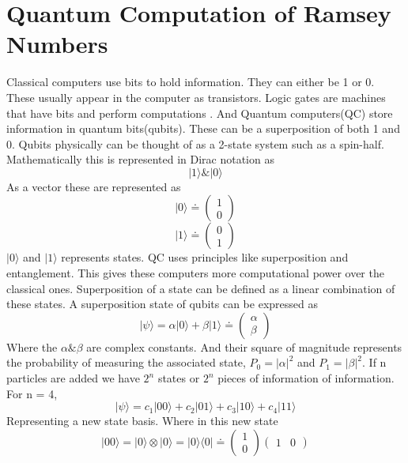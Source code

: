 \documentclass[15pt, a4paper]{Assignment}
\begin{document}
\section{Quantum Computation of Ramsey Numbers}
Classical computers use bits to hold information.
They can either be 1 or 0.
These usually appear in the computer as transistors.
Logic gates are machines that have bits and perform computations \cite{deutsch1985quantum}.
And Quantum computers(QC) store information in quantum bits(qubits).
These can be a superposition of both 1 and 0.
Qubits physically can be thought of as a 2-state system such as a spin-half.
Mathematically this is represented in Dirac notation as $$|1\rangle \& |0\rangle$$
As a vector these are represented as $$|0\rangle \doteq \begin{pmatrix}
	1\\0
\end{pmatrix}$$
$$|1\rangle \doteq \begin{pmatrix}
	0\\1
\end{pmatrix}$$
$|0\rangle$ and $|1\rangle$ represents states.
QC uses principles like superposition and entanglement.
This gives these computers more computational power over the classical ones.
Superposition of a state can be defined as a linear combination of these states.\cite{mcintyre_quantum_2012}
A superposition state of qubits can be expressed as \begin{equation}
|\psi\rangle = \alpha|0\rangle + \beta|1\rangle \doteq \begin{pmatrix}
	\alpha\\\beta
\end{pmatrix} \end{equation}
Where the $\alpha \& \beta$ are complex constants.
And their square of magnitude represents the probability of measuring the associated state, $P_{0}=|\alpha|^2$ and $P_{1}=|\beta|^2$. 
If n particles are added we have $2^n$ states or $2^n$ pieces of information of information. 
For n = 4,
\begin{equation}
	|\psi\rangle =c_1 |00\rangle+c_2 |01\rangle+c_3 |10\rangle+ c_4 |11\rangle
\end{equation}
Representing a new state basis. 
Where in this new state \begin{equation}|00\rangle = |0\rangle\otimes|0\rangle =|0\rangle\langle 0| \doteq
	\begin{pmatrix}
		1\\0
	\end{pmatrix} \begin{pmatrix}
		1&0
\end{pmatrix}\end{equation}
\end{document}
